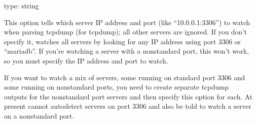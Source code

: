 \documentclass[letterpaper,10pt,english]{sphinxmanual}
\begin{document}
\begin{fulllineitems}
\label{\detokenize{mariadb-query-digest:cmdoption-mariadb-query-digest-watch-server}}
type: string

This option tells  which server IP address and port (like
“10.0.0.1:3306”) to watch when parsing tcpdump (for {\hyperref[\detokenize{mariadb-query-digest:cmdoption-mariadb-query-digest-type}]{}} tcpdump);
all other servers are ignored.  If you don’t specify it,
 watches all servers by looking for any IP address using port
3306 or “mariadb”.  If you’re watching a server with a non\sphinxhyphen{}standard port, this
won’t work, so you must specify the IP address and port to watch.

If you want to watch a mix of servers, some running on standard port 3306
and some running on non\sphinxhyphen{}standard ports, you need to create separate
tcpdump outputs for the non\sphinxhyphen{}standard port servers and then specify this
option for each.  At present  cannot auto\sphinxhyphen{}detect servers on
port 3306 and also be told to watch a server on a non\sphinxhyphen{}standard port.

\end{fulllineitems}
\end{document}
